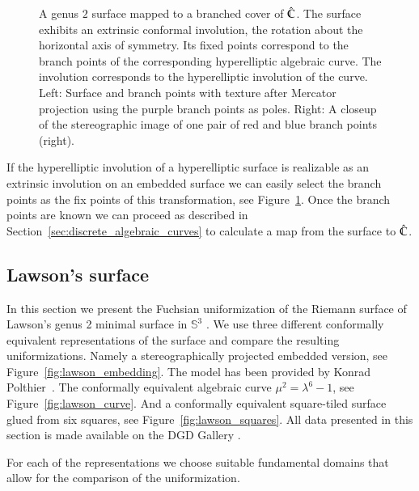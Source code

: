 \documentclass[Thesis.tex]{subfiles}
\begin{document}
\begin{figure} 
\centering
{}
\caption{
A genus $2$ surface mapped to a branched cover of $\hat{\mathbb C}$. 
The surface exhibits an extrinsic conformal involution, the rotation about the horizontal axis of symmetry. 
Its fixed points correspond to the branch points of the corresponding hyperelliptic algebraic curve.
The involution corresponds to the hyperelliptic involution of the curve.  
Left: Surface and branch points with texture after Mercator projection using the purple
branch points as poles. 
Right: A closeup of the stereographic image of one pair of red and blue branch points (right).
} 
\label{fig:genus2_branched} 
\end{figure}

If the hyperelliptic involution of a hyperelliptic surface is realizable as an extrinsic involution on an embedded surface we can easily select the branch points as the fix points of this transformation, see Figure~\ref{fig:genus2_branched}. 
Once the branch points are known we can proceed as described in Section~\ref{sec:discrete_algebraic_curves} to calculate a map from the surface to $\hat{\mathbb C}$.

\subsection{Lawson's surface}

In this section we present the Fuchsian uniformization of the Riemann surface of Lawson's genus 2 minimal surface in $\mathbb{S}^3$ \cite{Law1970}.
We use three different conformally equivalent representations of the surface and compare the resulting uniformizations.
Namely a stereographically projected embedded version, see Figure~\ref{fig:lawson_embedding}.
The model has been provided by Konrad Polthier~\cite{polthier97}.
The conformally equivalent algebraic curve $\mu^2=\lambda^6-1$, see Figure~\ref{fig:lawson_curve}.
And a conformally equivalent square-tiled surface glued from six squares, see Figure~\ref{fig:lawson_squares}.
All data presented in this section is made available on the {\sc DGD Gallery} \cite{gallery-lawson-webpage}.

For each of the representations we choose suitable fundamental domains that allow for the comparison of the uniformization.
\end{document}
